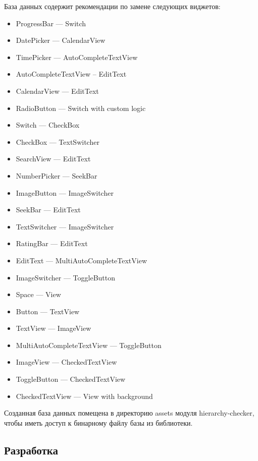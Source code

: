\documentclass[a4paper,14pt]{extarticle} %
\begin{document}
	База данных содержит рекомендации по замене следующих виджетов:
	\begin{itemize}
		\item ProgressBar --- Switch
		\item DatePicker --- CalendarView
		\item TimePicker --- AutoCompleteTextView
		\item AutoCompleteTextView – EditText
		\item CalendarView --- EditText
		\item RadioButton --- Switch with custom logic
		\item Switch --- CheckBox
		\item CheckBox --- TextSwitcher
		\item SearchView --- EditText
		\item NumberPicker --- SeekBar
		\item ImageButton --- ImageSwitcher
		\item SeekBar --- EditText
		\item TextSwitcher --- ImageSwitcher
		\item RatingBar --- EditText
		\item EditText --- MultiAutoCompleteTextView
		\item ImageSwitcher --- ToggleButton
		\item Space --- View
		\item Button --- TextView
		\item TextView --- ImageView
		\item MultiAutoCompleteTextView --- ToggleButton
		\item ImageView --- CheckedTextView
		\item ToggleButton --- CheckedTextView
		\item CheckedTextView --- View with background
	\end{itemize}

	Созданная база данных помещена в директорию assets модуля hierarchy-checker, чтобы иметь доступ к бинарному файлу базы из библиотеки.

	\subsection{Разработка}
	
\end{document}
